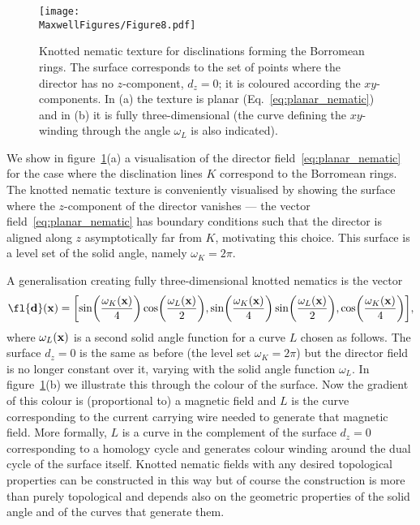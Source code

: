     \begin{figure}[htbp]
        \centering
        \texttt{[image: \\MaxwellFigures/Figure8.pdf]}
        \caption[Constructing knotted nematic disclinations from solid angle.]{Knotted nematic texture for disclinations forming the Borromean rings. The surface corresponds to the set of points where the director has no $z$-component, $d_z=0$; it is coloured according the $xy$-components. In (a) the texture is planar (Eq.~\eqref{eq:planar_nematic}) and in (b) it is fully three-dimensional (the curve defining the $xy$-winding through the angle $\omega_L$ is also indicated).}
        \label{fig:nematic}
    \end{figure}

    We show in figure~\ref{fig:nematic}(a) a visualisation of the director field~\eqref{eq:planar_nematic} for the case where the disclination lines $K$ correspond to the Borromean rings. The knotted nematic texture is conveniently visualised by showing the surface where the $z$-component of the director vanishes --- the vector field~\eqref{eq:planar_nematic} has boundary conditions such that the director is aligned along $z$ asymptotically far from $K$, motivating this choice. This surface is a level set of the solid angle, namely $\omega_{K}=2\pi$. 

    A generalisation creating fully three-dimensional knotted nematics is the vector 
    \begin{equation}
        \fl    {\bf d}({\bf x}) = \biggl[ \sin\biggl(\frac{\omega_{K}({\bf x})}{4}\biggr) \cos\biggl(\frac{\omega_{L}({\bf x})}{2}\biggr) , \sin\biggl(\frac{\omega_{K}({\bf x})}{4}\biggr) \sin\biggl(\frac{\omega_{L}({\bf x})}{2}\biggr) , \cos\biggl(\frac{\omega_{K}({\bf x})}{4}\biggr)  \biggr] ,
        \label{eq:nonplanar_nematic}
    \end{equation}
    where $\omega_{L}({\bf x})$ is a second solid angle function for a curve $L$ chosen as follows. The surface $d_z=0$ is the same as before (the level set $\omega_{K}=2\pi$) but the director field is no longer constant over it, varying with the solid angle function $\omega_{L}$. In figure~\ref{fig:nematic}(b) we illustrate this through the colour of the surface. Now the gradient of this colour is (proportional to) a magnetic field and $L$ is the curve corresponding to the current carrying wire needed to generate that magnetic field. More formally, $L$ is a curve in the complement of the surface $d_z=0$ corresponding to a homology cycle and generates colour winding around the dual cycle of the surface itself. Knotted nematic fields with any desired topological properties can be constructed in this way but of course the construction is more than purely topological and depends also on the geometric properties of the solid angle and of the curves that generate them. 

